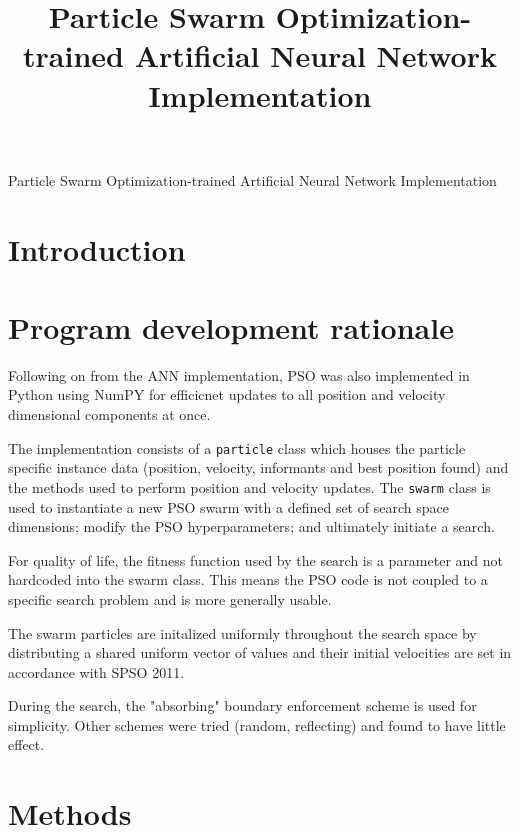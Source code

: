 \documentclass[12pt]{article}
\begin{document}
\title{Particle Swarm Optimization-trained Artificial Neural Network Implementation}

\begin{center}
  \Large{Particle Swarm Optimization-trained Artificial Neural Network Implementation}
\end{center}

\vspace{-2em}
\section{Introduction}


\vspace{-1.5em}
\section{Program development rationale}

Following on from the ANN implementation, PSO was also implemented in
Python using NumPY for efficicnet updates to all position and velocity
dimensional components at once.

The implementation consists of a \texttt{particle} class which houses the
particle specific instance data (position, velocity, informants and best position found) and the
methods used to perform position and velocity updates. The \texttt{swarm}
class is used to instantiate a new PSO swarm with a defined set of search space
dimensions; modify the PSO hyperparameters; and ultimately initiate a search.

For quality of life, the fitness function used by the search is a parameter
and not hardcoded into the swarm class. This means the PSO code is not coupled
to a specific search problem and is more generally usable.

The swarm particles are initalized uniformly throughout the search space
by distributing a shared uniform vector of values and their initial velocities
are set in accordance with SPSO 2011. \cite{Clerc}

During the search, the "absorbing" \cite{Chu} boundary enforcement scheme is used
for simplicity. Other schemes were tried (random, reflecting) and found to have
little effect.

\vspace{-1.5em}
\section{Methods}
\end{document}
